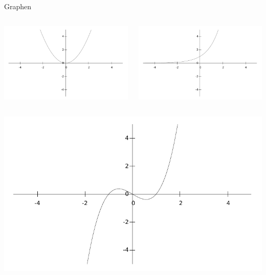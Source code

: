     \begin{frame}{Graphen}
        \begin{columns}
            \begin{column}{.5\textwidth}
                \includegraphics[width=1\textwidth]{graphics/01/01.pdf}
            \end{column}
            \begin{column}{.5\textwidth}
                \includegraphics[width=1\textwidth]{graphics/01/02.pdf}
            \end{column}
        \end{columns}
        \begin{columns}
            \begin{column}{.5\textwidth}
                \includegraphics[width=1.\textwidth]{graphics/01/03.pdf}

\end{column}
\end{columns}
\end{frame}
